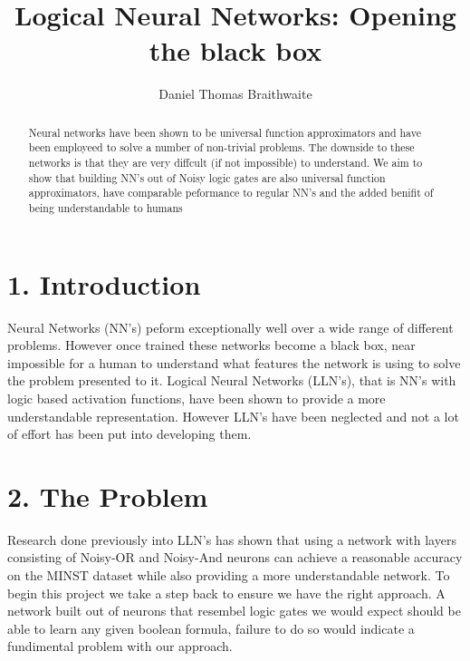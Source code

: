 \documentclass[11pt, a4paper, twoside, openright]{report}
\title{Logical Neural Networks: Opening the black box}
\author{Daniel Thomas Braithwaite}
\date{}
\begin{document}
\frontmatter


\begin{abstract}
Neural networks have been shown to be universal function approximators  and have been employeed to solve a number of non-trivial problems. The downside to these networks is that they are very diffcult (if not impossible) to understand. We aim to show that building NN's out of Noisy logic gates are also universal function approximators, have comparable peformance to regular NN's and the added benifit of being understandable to humans
\end{abstract}


\maketitle




\mainmatter


\section*{1. Introduction}

Neural Networks (NN's) peform exceptionally well over a wide range of different problems. However once trained these networks become a black box, near impossible for a human to understand what features the network is using to solve the problem presented to it. Logical Neural Networks (LLN's), that is NN's with logic based activation functions, have been shown to provide a more understandable representation. However LLN's have been neglected and not a lot of effort has been put into developing them.

\section*{2. The Problem}

Research done previously into LLN's has shown that using a network with layers consisting of Noisy-OR and Noisy-And neurons can achieve a reasonable accuracy on the MINST dataset while also providing a more understandable network. To begin this project we take a step back to ensure we have the right approach. A network built out of neurons that resembel logic gates we would expect should be able to learn any given boolean formula, failure to do so would indicate a fundimental problem with our approach.\\
\end{document}
